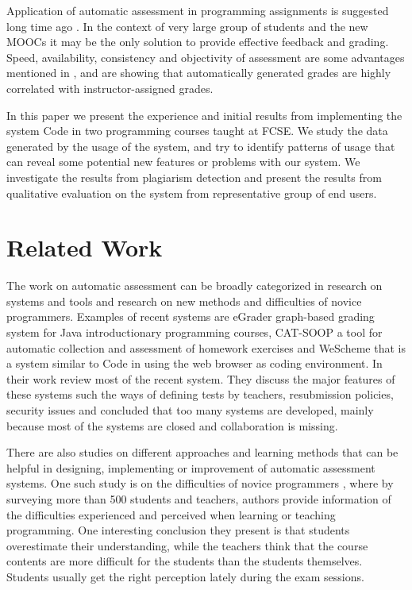 \documentclass{llncs}
\begin{document}
Application of automatic assessment in programming assignments is suggested long
time ago \cite{hollingsworth1960automatic}. In the context of very large group
of students and the new MOOCs it may be the only solution to provide effective
feedback and grading. Speed, availability, consistency and objectivity of
assessment are some advantages mentioned in \cite{ala2005survey}, and
\cite{vujovsevic2013software} are showing that automatically generated grades
are highly correlated with instructor-assigned grades.

In this paper we present the experience and initial results from
implementing the system Code in two programming courses taught at FCSE. We
study the data generated by the usage of the system, and try to identify
patterns of usage that can reveal some potential new features or problems
with our system. We investigate the results from plagiarism detection and
present the results from qualitative evaluation on the system from
representative group of end users.

\section{Related Work}

The work on automatic assessment can be broadly categorized in research on
systems and tools and research on new methods and difficulties of novice
programmers. Examples of recent systems are eGrader \cite{shamsi2012intelligent}
graph-based grading system for Java introductionary programming courses,
CAT-SOOP \cite{hartz2012cat} a tool for automatic collection and assessment of
homework exercises and WeScheme \cite{yoo2011wescheme} that is a system
similar to Code \cite{delev2012lab} in using the web browser as coding
environment. In their work \cite{ihantola2010review} review most of the recent system.
They discuss the major features of these systems such the ways of defining tests
by teachers, resubmission policies, security issues and concluded that too many
systems are developed, mainly because most of the systems are closed and
collaboration is missing.

There are also studies on different approaches and learning methods that can be
helpful in designing, implementing or improvement of automatic assessment
systems. One such study is on the difficulties of novice programmers
\cite{lahtinen2005study}, where by surveying more than 500 students and
teachers, authors provide information of the difficulties experienced and
perceived when learning or teaching programming. One interesting conclusion they present is
that students overestimate their understanding, while the teachers think that
the course contents are more difficult for the students than the students
themselves. Students usually get the right perception lately during the exam
sessions.
\end{document}
